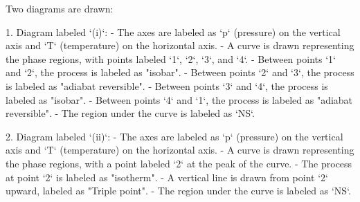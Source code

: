 Two diagrams are drawn:  

1. Diagram labeled `(i)`:
   - The axes are labeled as `p` (pressure) on the vertical axis and `T` (temperature) on the horizontal axis.  
   - A curve is drawn representing the phase regions, with points labeled `1`, `2`, `3`, and `4`.  
   - Between points `1` and `2`, the process is labeled as "isobar".  
   - Between points `2` and `3`, the process is labeled as "adiabat reversible".  
   - Between points `3` and `4`, the process is labeled as "isobar".  
   - Between points `4` and `1`, the process is labeled as "adiabat reversible".  
   - The region under the curve is labeled as `NS`.  

2. Diagram labeled `(ii)`:
   - The axes are labeled as `p` (pressure) on the vertical axis and `T` (temperature) on the horizontal axis.  
   - A curve is drawn representing the phase regions, with a point labeled `2` at the peak of the curve.  
   - The process at point `2` is labeled as "isotherm".  
   - A vertical line is drawn from point `2` upward, labeled as "Triple point".  
   - The region under the curve is labeled as `NS`.